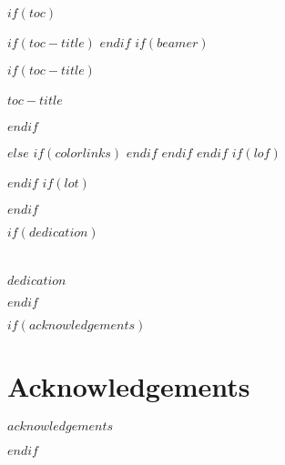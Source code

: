 $if(toc)$
\pagebreak

\setcounter{secnumdepth}{10} %

\newlength{\scratchlength}%

\renewcommand{\cftchappresnum}{Chapter }
\settowidth{\scratchlength}{\bfseries\cftchappresnum\cftchapaftersnum}%
\addtolength{\cftchapnumwidth}{\scratchlength} %

\renewcommand{\cftchapleader}{\cftdotfill{\cftdotsep}}

$if(toc-title)$
\renewcommand*\contentsname{$toc-title$}
$endif$
$if(beamer)$
\begin{frame}[allowframebreaks]
  $if(toc-title)$
  \frametitle{$toc-title$}
  $endif$
  \tableofcontents[hideallsubsections]
\end{frame}
$else$
{
    $if(colorlinks)$
    \hypersetup{linkcolor=$if(toccolor)$$toccolor$$else$$endif$}
    $endif$
    \setcounter{tocdepth}{$toc-depth$}
    \tableofcontents
  }
$endif$
$endif$
$if(lof)$

\renewcommand{\cftfigpresnum}{Figure~}
\setlength{\cftfignumwidth}{6em}
\renewcommand{\cftfigaftersnum}{:}

\listoffigures
{}
$endif$
$if(lot)$

\renewcommand{\cfttabpresnum}{Table~}
\setlength{\cfttabnumwidth}{6em}
\renewcommand{\cfttabaftersnum}{:}

\listoftables
{}
$endif$

$if(dedication)$
\chapter*{}
\thispagestyle{empty}
\begin{center}
  \textit{\large $dedication$}
\end{center}
$endif$

$if(acknowledgements)$
\chapter{Acknowledgements}
\begin{doublespace}
  $acknowledgements$
\end{doublespace}
$endif$